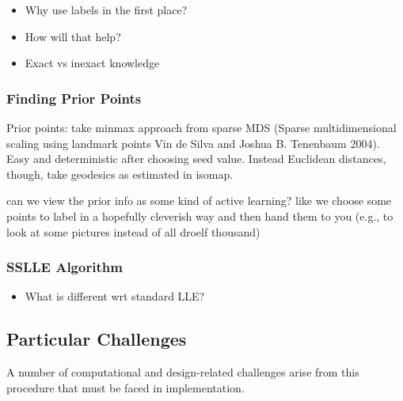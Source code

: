 
\begin{itemize}
  \item Why use labels in the first place?
  \item How will that help?
  \item Exact vs inexact knowledge
\end{itemize}


\subsubsection{Finding Prior Points}
\label{prior-points}

Prior points: take minmax approach from sparse MDS (Sparse multidimensional 
scaling using landmark points Vin de Silva and Joshua B. Tenenbaum 2004). 
Easy and deterministic after choosing seed value.
Instead Euclidean distances, though, take geodesics as estimated in isomap.

can we view the prior info as some kind of active learning? like we choose 
some points to label in a hopefully cleverish way and then hand them to you 
(e.g., to look at some pictures instead of all droelf thousand)


\subsubsection{SSLLE Algorithm}
\label{algo-sslle}

\begin{itemize}
  \item What is different wrt standard LLE?
\end{itemize}


\subsection{Particular Challenges}
\label{challenges}

A number of computational and design-related challenges arise from this 
procedure that must be faced in implementation.
\\

